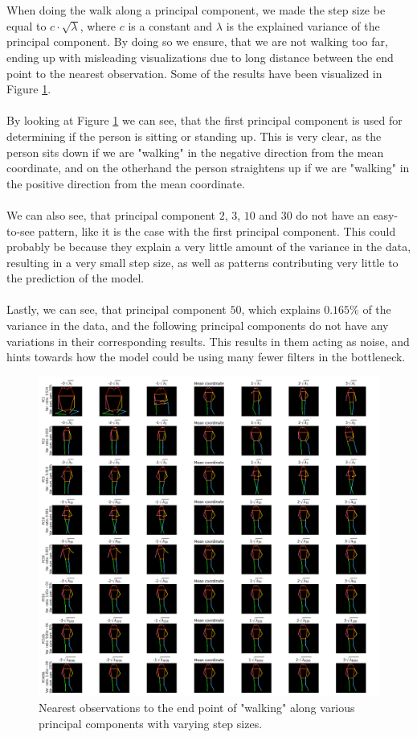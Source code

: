 \documentclass[./main.tex]{subfiles}
\begin{document}
\\
\\
When doing the walk along a principal component, we made the step size be equal to $c \cdot \sqrt{\lambda}$, where $c$ is a constant and $\lambda$ is the explained variance of the principal component. By doing so we ensure, that we are not walking too far, ending up with misleading visualizations due to long distance between the end point to the nearest observation. Some of the results have been visualized in Figure \ref{fig:shape_analysis}.
\\
\\
By looking at Figure \ref{fig:shape_analysis} we can see, that the first principal component is used for determining if the person is sitting or standing up. This is very clear, as the person sits down if we are "walking" in the negative direction from the mean coordinate, and on the otherhand the person straightens up if we are "walking" in the positive direction from the mean coordinate.
\\
\\
We can also see, that principal component $2$, $3$, $10$ and $30$ do not have an easy-to-see pattern, like it is the case with the first principal component. This could probably be because they explain a very little amount of the variance in the data, resulting in a very small step size, as well as patterns contributing very little to the prediction of the model.
\\
\\
Lastly, we can see, that principal component $50$, which explains $0.165\%$ of the variance in the data, and the following principal components do not have any variations in their corresponding results. This results in them acting as noise, and hints towards how the model could be using many fewer filters in the bottleneck.
\begin{figure}[htbp]
    \centering
    \includegraphics[width = \textwidth]{entities/shape_analysis.png}
    \caption{Nearest observations to the end point of "walking" along various principal components with varying step sizes.}
    \label{fig:shape_analysis}
\end{figure}
\end{document}
